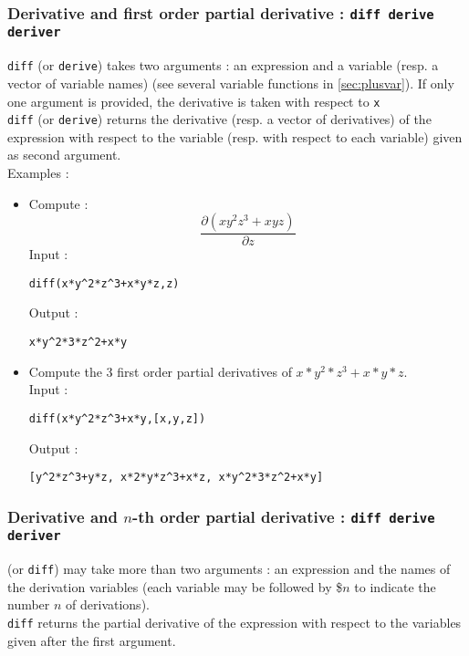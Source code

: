 \documentclass[a4paper,11pt]{book}
\begin{document}
\subsubsection{Derivative and first order partial derivative : {\tt diff derive deriver}}
{\tt diff} (or {\tt derive}) takes two arguments : an expression and a variable
(resp. a vector of variable names) (see several variable functions in
 \ref{sec:plusvar}). If only one argument is provided, the derivative
is taken with respect to {\tt x}\\
{\tt diff} (or {\tt derive}) returns the derivative (resp. a vector of 
derivatives) of the expression with respect to the variable (resp. with respect 
to each variable) given as second argument.\\
Examples :
\begin{itemize}
\item Compute :
$$\frac {\partial (x y^2 z^3+x y z)}{\partial z}$$
Input :
\begin{center}{\tt  diff(x*y\verb|^|2*z\verb|^|3+x*y*z,z)}\end{center}
Output :
\begin{center}{\tt x*y\verb|^|2*3*z\verb|^|2+x*y}\end{center}
\item Compute the 3 first order partial derivatives of $x*y^2*z^3+x*y*z$.\\
Input :
\begin{center}{\tt  diff(x*y\verb|^|2*z\verb|^|3+x*y,[x,y,z])}\end{center}
Output :
\begin{center}{\tt [y\verb|^|2*z\verb|^|3+y*z, x*2*y*z\verb|^|3+x*z, x*y\verb|^|2*3*z\verb|^|2+x*y]}\end{center}
\end{itemize}

\subsubsection{Derivative and $n$-th order
partial derivative : {\tt diff derive deriver}}\index{\$}
 (or {\tt diff}) may take more than two arguments : an
expression and the names of the derivation variables (each variable
may be followed by \$$n$ to indicate the number $n$ of derivations).\\
{\tt diff} returns the partial derivative of the expression with respect to 
the variables given after the first argument.
\end{document}
